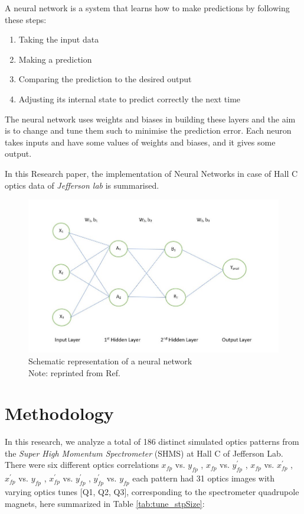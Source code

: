 \documentclass[conference]{IEEEtran}
\begin{document}
A neural network is a system that learns how to make predictions by following these steps:
\begin{enumerate}
    \item Taking the input data
    \item Making a prediction
    \item Comparing the prediction to the desired output
    \item Adjusting its internal state to predict correctly the next time
\end{enumerate}
The neural network uses weights and biases in building these layers and the aim is to change and tune them such to minimise the prediction error.
Each neuron takes inputs and have some values of weights and biases, and it gives some output.

In this Research paper, the implementation of Neural Networks in case of Hall C optics data of \emph{Jefferson lab} is summarised.

\begin{figure}[h]
    \centering
    \includegraphics[scale=0.22]{images/neural.jpeg}
    \caption{Schematic representation of a neural network\\
    Note: reprinted from Ref. \cite{NN_Intro_TB_2020}}
    \label{fig:neuron_img.png}
\end{figure}



\section{Methodology}
\indent In this research, we analyze a total of 186 distinct simulated optics patterns from the \emph{Super High Momentum Spectrometer} (SHMS) at Hall C of Jefferson Lab.
There were six different optics correlations  $x_{fp}$ vs. $y_{fp}$  ,  $x_{fp}$ vs. $y^{'}_{fp}$  ,  $x_{fp}$ vs. $x^{'}_{fp}$  ,  $x^{'}_{fp}$ vs. $y_{fp}$  ,  $x^{'}_{fp}$ vs. $y^{'}_{fp}$  ,  $y^{'}_{fp}$ vs. $y_{fp}$  each pattern had 31 optics images with varying optics tunes [Q1, Q2, Q3], corresponding to the spectrometer quadrupole magnets, here summarized in Table \ref{tab:tune_stpSize}:
\end{document}
